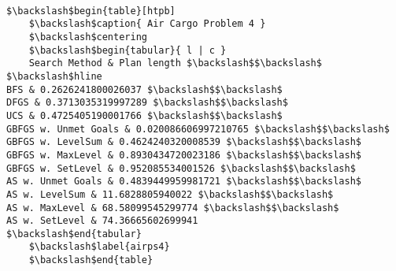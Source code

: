 \documentclass{article}
\begin{document}
\begin{verbatim}
    
$\backslash$begin{table}[htpb]
    $\backslash$caption{ Air Cargo Problem 4 }
    $\backslash$centering
    $\backslash$begin{tabular}{ l | c }
    Search Method & Plan length $\backslash$$\backslash$ $\backslash$hline 
BFS & 0.2626241800026037 $\backslash$$\backslash$
DFGS & 0.3713035319997289 $\backslash$$\backslash$
UCS & 0.4725405190001766 $\backslash$$\backslash$
GBFGS w. Unmet Goals & 0.020086606997210765 $\backslash$$\backslash$
GBFGS w. LevelSum & 0.4624240320008539 $\backslash$$\backslash$
GBFGS w. MaxLevel & 0.8930434720023186 $\backslash$$\backslash$
GBFGS w. SetLevel & 0.952085534001526 $\backslash$$\backslash$
AS w. Unmet Goals & 0.4839449959981721 $\backslash$$\backslash$
AS w. LevelSum & 11.6828805940022 $\backslash$$\backslash$
AS w. MaxLevel & 68.58099545299774 $\backslash$$\backslash$
AS w. SetLevel & 74.36665602699941
$\backslash$end{tabular}
    $\backslash$label{airps4}
    $\backslash$end{table}

    
\end{verbatim}







    
  
\end{document}
